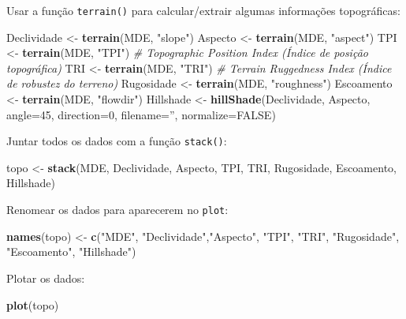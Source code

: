 \documentclass[
]{book}
\newenvironment{Shaded}{\begin{snugshade}}{\end{snugshade}}
\newcommand{\CommentTok}[1]{\textcolor[rgb]{0.56,0.35,0.01}{\textit{#1}}}
\newcommand{\DataTypeTok}[1]{\textcolor[rgb]{0.13,0.29,0.53}{#1}}
\newcommand{\DecValTok}[1]{\textcolor[rgb]{0.00,0.00,0.81}{#1}}
\newcommand{\KeywordTok}[1]{\textcolor[rgb]{0.13,0.29,0.53}{\textbf{#1}}}
\newcommand{\NormalTok}[1]{#1}
\newcommand{\OtherTok}[1]{\textcolor[rgb]{0.56,0.35,0.01}{#1}}
\newcommand{\StringTok}[1]{\textcolor[rgb]{0.31,0.60,0.02}{#1}}
\begin{document}
Usar a função \texttt{terrain()} para calcular/extrair algumas informações topográficas:

\begin{Shaded}
\begin{Highlighting}[]
\NormalTok{Declividade <-}\StringTok{ }\KeywordTok{terrain}\NormalTok{(MDE, }\StringTok{"slope"}\NormalTok{)}
\NormalTok{Aspecto <-}\StringTok{ }\KeywordTok{terrain}\NormalTok{(MDE, }\StringTok{"aspect"}\NormalTok{)}
\NormalTok{TPI <-}\StringTok{ }\KeywordTok{terrain}\NormalTok{(MDE, }\StringTok{"TPI"}\NormalTok{) }\CommentTok{# Topographic Position Index (Índice de posição topográfica)}
\NormalTok{TRI <-}\StringTok{ }\KeywordTok{terrain}\NormalTok{(MDE, }\StringTok{"TRI"}\NormalTok{) }\CommentTok{# Terrain Ruggedness Index (Índice de robustez do terreno)}
\NormalTok{Rugosidade <-}\StringTok{ }\KeywordTok{terrain}\NormalTok{(MDE, }\StringTok{"roughness"}\NormalTok{)}
\NormalTok{Escoamento <-}\StringTok{ }\KeywordTok{terrain}\NormalTok{(MDE, }\StringTok{"flowdir"}\NormalTok{)}
\NormalTok{Hillshade <-}\StringTok{ }\KeywordTok{hillShade}\NormalTok{(Declividade, Aspecto, }\DataTypeTok{angle=}\DecValTok{45}\NormalTok{, }\DataTypeTok{direction=}\DecValTok{0}\NormalTok{, }\DataTypeTok{filename=}\StringTok{''}\NormalTok{, }\DataTypeTok{normalize=}\OtherTok{FALSE}\NormalTok{)}
\end{Highlighting}
\end{Shaded}

Juntar todos os dados com a função \texttt{stack()}:

\begin{Shaded}
\begin{Highlighting}[]
\NormalTok{topo <-}\StringTok{ }\KeywordTok{stack}\NormalTok{(MDE, Declividade, Aspecto, TPI, TRI, Rugosidade, Escoamento, Hillshade)}
\end{Highlighting}
\end{Shaded}

Renomear os dados para aparecerem no \texttt{plot}:

\begin{Shaded}
\begin{Highlighting}[]
\KeywordTok{names}\NormalTok{(topo) <-}\StringTok{ }\KeywordTok{c}\NormalTok{(}\StringTok{"MDE"}\NormalTok{, }\StringTok{"Declividade"}\NormalTok{,}\StringTok{"Aspecto"}\NormalTok{, }\StringTok{"TPI"}\NormalTok{, }\StringTok{"TRI"}\NormalTok{, }\StringTok{"Rugosidade"}\NormalTok{, }\StringTok{"Escoamento"}\NormalTok{, }\StringTok{"Hillshade"}\NormalTok{)}
\end{Highlighting}
\end{Shaded}

Plotar os dados:

\begin{Shaded}
\begin{Highlighting}[]
\KeywordTok{plot}\NormalTok{(topo)}
\end{Highlighting}
\end{Shaded}

  
\end{document}
